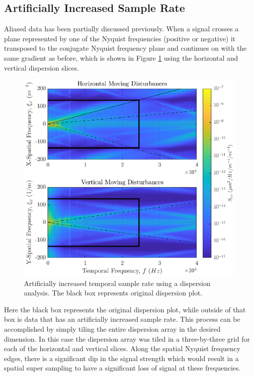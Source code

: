 \subsection{Artificially Increased Sample Rate}
Aliased data has been partially discussed previously.
When a signal crosses a plane represented by one of the Nyquist frequencies (positive or negative) it transposed to the conjugate Nyquist frequency plane and continues on with the same gradient as before, which is shown in Figure \ref{fig:04_dispersion_supersample} using the horizontal and vertical dispersion slices.
\begin{figure}
  \centering
  \includegraphics{../matlab/04_dispersion_analysis/dispersion_supersample.eps}
  \caption{Artificially increased temporal sample rate using a dispersion analysis. The black box represents original dispersion plot.}
  \label{fig:04_dispersion_supersample}
\end{figure}
Here the black box represents the original dispersion plot, while outside of that box is data that has an artificially increased sample rate.
This process can be accomplished by simply tiling the entire dispersion array in the desired dimension.
In this case the dispersion array was tiled in a three-by-three grid for each of the horizontal and vertical slices.
Along the spatial Nyquist frequency edges, there is a significant dip in the signal strength which would result in a spatial super sampling to have a significant loss of signal at these frequencies.

